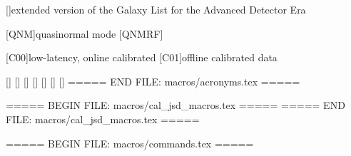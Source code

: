 [\GLADEplus{}]{extended version of the Galaxy List for the Advanced Detector Era}

[QNM]{quasinormal mode}
[QNMRF]{}

[C00]{low-latency, online calibrated}
[C01]{offline calibrated data}

[\gwSepShort]{\gwSepLong}
[\gwFebShort]{\gwFebLong}
[\gwFirst]{\gwFirst}
[\gwBNS]{\gwBNS}
[\gwAug]{\gwAug}
[\gwSingleLoud]{\gwSingleLoud}
[\gwJanLoud]{\gwJanLoud}
===== END FILE: macros/acronyms.tex =====

===== BEGIN FILE: macros/cal_jsd_macros.tex =====
\newcommand{\septJSDamplitudeMed}{0.06}
\newcommand{\septJSDamplitudeMinus}{0.05}
\newcommand{\septJSDamplitudePlus}{0.09}
\newcommand{\septJSDamplitudeUncert}{\ensuremath{\septJSDamplitudeMed_{-\septJSDamplitudeMinus}^{+\septJSDamplitudePlus}}}
\newcommand{\septJSDphaseMed}{0.05}
\newcommand{\septJSDphaseMinus}{0.05}
\newcommand{\septJSDphasePlus}{0.13}
\newcommand{\septJSDphaseUncert}{\ensuremath{\septJSDphaseMed_{-\septJSDphaseMinus}^{+\septJSDphasePlus}}}
\newcommand{\febJSDamplitudeMed}{0.15}
\newcommand{\febJSDamplitudeMinus}{0.15}
\newcommand{\febJSDamplitudePlus}{0.11}
\newcommand{\febJSDamplitudeUncert}{\ensuremath{\febJSDamplitudeMed_{-\febJSDamplitudeMinus}^{+\febJSDamplitudePlus}}}
\newcommand{\febJSDphaseMed}{0.14}
\newcommand{\febJSDphaseMinus}{0.14}
\newcommand{\febJSDphasePlus}{0.13}
\newcommand{\febJSDphaseUncert}{\ensuremath{\febJSDphaseMed_{-\febJSDphaseMinus}^{+\febJSDphasePlus}}}
===== END FILE: macros/cal_jsd_macros.tex =====

===== BEGIN FILE: macros/commands.tex =====

\newcommand{\ssec}[1]{{{\em #1}---}}





\newcommand{\red}{\textcolor{note-purple}}
\newcommand{\todo}[1]{\red{[TODO: #1]}}
\newcommand{\note}[1]{\red{[NOTE: #1]}}
\newcommand{\fixme}[1]{\textcolor{danger-red}{#1}}




\newcommand{\reviewed}[1]{{#1}}


